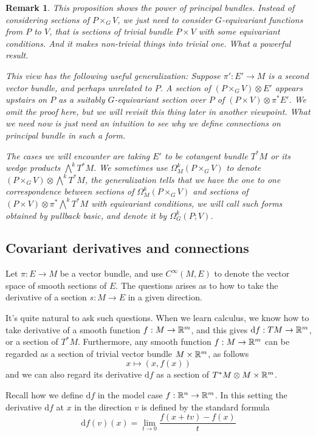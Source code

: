 \documentclass[11pt]{amsart}
\numberwithin{equation}{section}
\theoremstyle{plain}
\theoremstyle{plain}
\newtheorem{remksub}[thmsub]{Remark}
\numberwithin{equation}{section}
\begin{document}
\begin{remksub}\normalfont
This proposition shows the power of principal bundles. Instead of considering sections of $P\times_GV$, we just need to consider $G$-equivariant functions from $P$ to $V$, that is sections of trivial bundle $P\times V$ with some equivariant conditions. And it makes non-trivial things into trivial one. What a powerful result.

This view has the following useful generalization: Suppose $\pi':E'\to M$ is a second vector bundle, and perhaps unrelated to $P$. A section of $(P\times_GV)\otimes E'$ appears upstairs on $P$ as a suitably $G$-equivariant section over $P$ of $(P\times V)\otimes \pi^*E'$. We omit the proof here, but we will revisit this thing later in another viewpoint. What we need now is just need an intuition to see why we define connections on principal bundle in such a form.

The cases we will encounter are taking $E'$ to be cotangent bundle $T^*M$ or its wedge products $\bigwedge^kT^*M$. We sometimes use $\Omega_M^k(P\times_GV)$ to denote $(P\times_GV)\otimes\bigwedge^kT^*M$, the generalization tells that we have the one to one correspondence between sections of $\Omega_M^k(P\times_GV)$ and sections of $(P\times V)\otimes\pi^*\bigwedge^kT^*M$ with equivariant conditions, we will call such forms obtained by pullback basic, and denote it by $\Omega_G^k(P;V)$.
\end{remksub}

\subsection{Covariant derivatives and connections}
Let $\pi:E\to M$ be a vector bundle, and use $C^{\infty}(M,E)$ to denote the vector space of smooth sections of $E$. The questions arises as to how to take the derivative of a section $s:M\to E$ in a given direction. 

It's quite natural to ask such questions. When we learn calculus, we know how to take derivative of a smooth function $f:M\to\Bbb{R}^m$, and this gives $\mathrm{d}f:TM\to\Bbb{R}^m$, or a section of $T^*M$. Furthermore, any smooth function $f:M\to\Bbb{R}^m$ can be regarded as a section of trivial vector bundle $M\times\Bbb{R}^m$, as follows
$$
x\mapsto(x,f(x))
$$
and we can also regard its derivative $\mathrm{d}f$ as a section of $T^*M\otimes M\times\Bbb{R}^m$.

Recall how we define $\mathrm{d}f$ in the model case $f:\Bbb{R}^n\to\Bbb{R}^m$. In this setting the derivative $\mathrm{d}f$ at $x$ in the direction $v$ is defined by the standard formula
$$
\mathrm{d}f(v)(x)=\lim_{t\to0}\frac{f(x+tv)-f(x)}{t}
$$
\end{document}
